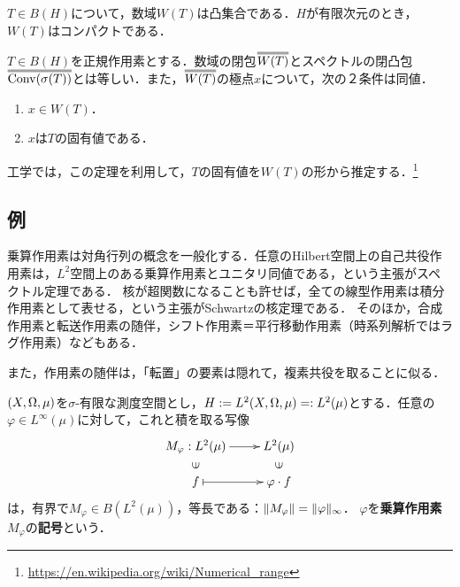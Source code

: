 \documentclass[uplatex,dvipdfmx]{jsreport}
\begin{document}
\begin{proposition}
    $T\in B(H)$について，数域$W(T)$は凸集合である．$H$が有限次元のとき，$W(T)$はコンパクトである．
\end{proposition}

\begin{proposition}
    $T\in B(H)$を正規作用素とする．数域の閉包$\oo{W(T)}$とスペクトルの閉凸包$\oo{\Conv(\sigma(T))}$とは等しい．また，$\oo{W(T)}$の極点$x$について，次の２条件は同値．
    \begin{enumerate}
        \item $x\in W(T)$．
        \item $x$は$T$の固有値である．
    \end{enumerate}
\end{proposition}
\begin{remark}
    工学では，この定理を利用して，$T$の固有値を$W(T)$の形から推定する．\footnote{\url{https://en.wikipedia.org/wiki/Numerical_range}}
\end{remark}

\subsection{例}

\begin{tcolorbox}[colframe=ForestGreen, colback=ForestGreen!10!white,breakable,colbacktitle=ForestGreen!40!white,coltitle=black,fonttitle=\bfseries\sffamily,
title=]
    乗算作用素は対角行列の概念を一般化する．任意のHilbert空間上の自己共役作用素は，$L^2$空間上のある乗算作用素とユニタリ同値である，という主張がスペクトル定理である．
    核が超関数になることも許せば，全ての線型作用素は積分作用素として表せる，という主張がSchwartzの核定理である．
    そのほか，合成作用素と転送作用素の随伴，シフト作用素＝平行移動作用素（時系列解析ではラグ作用素）などもある．

    また，作用素の随伴は，「転置」の要素は隠れて，複素共役を取ることに似る．
\end{tcolorbox}

\begin{theorem}\label{operator-multiplication}
    $(X,\Omega,\mu)$を$\sigma$-有限な測度空間とし，$H:=L^2(X,\Omega,\mu)=:L^2(\mu)$とする．任意の$\varphi\in L^\infty(\mu)$に対して，これと積を取る写像
    \[\xymatrix@R-2pc{
        M_\varphi:L^2(\mu)\ar[r]&L^2(\mu)\\
        \rotatebox[origin=c]{90}{$\in$}&\rotatebox[origin=c]{90}{$\in$}\\
        f\ar@{|->}[r]&\varphi\cdot f
    }\]
    は，有界で$M_\varphi\in B(L^2(\mu))$，等長である：$\|M_\varphi\|=\|\varphi\|_\infty$．
    $\varphi$を\textbf{乗算作用素}$M_\varphi$の\textbf{記号}という．
\end{theorem}
\end{document}
